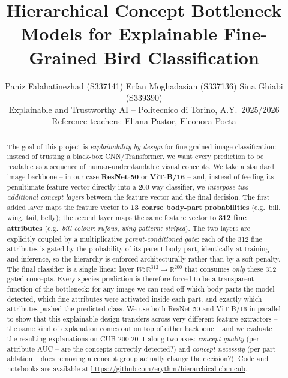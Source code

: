 \documentclass[10pt,conference,twocolumn,a4paper]{article}
\title{\vspace{-2em}\textbf{Hierarchical Concept Bottleneck Models for
Explainable Fine-Grained Bird Classification}}
\author{Paniz Falahatinezhad (S337141) \quad Erfan Moghadasian (S337136) \quad Sina Ghiabi (S339390) \\
\small Explainable and Trustworthy AI -- Politecnico di Torino, A.Y.\ 2025/2026 \\
\small Reference teachers: Eliana Pastor, Eleonora Poeta}
\date{\vspace{-1.5em}}
\begin{document}
\maketitle
\thispagestyle{empty}

\begin{abstract}\small
The goal of this project is \emph{explainability-by-design} for fine-grained
image classification: instead of trusting a black-box CNN/Transformer, we
want every prediction to be readable as a sequence of human-understandable
visual concepts. We take a standard image backbone -- in our case
\textbf{ResNet-50} or \textbf{ViT-B/16} -- and, instead of feeding its
penultimate feature vector directly into a 200-way classifier, we
\emph{interpose two additional concept layers} between the feature vector
and the final decision. The first added layer maps the feature vector to
\textbf{13 coarse body-part probabilities} (e.g.\ bill, wing, tail, belly);
the second layer maps the same feature vector to \textbf{312 fine
attributes} (e.g.\ \emph{bill colour: rufous}, \emph{wing pattern:
striped}). The two layers are explicitly coupled by a multiplicative
\emph{parent-conditioned gate}: each of the 312 fine attributes is gated by
the probability of its parent body part, identically at training and
inference, so the hierarchy is enforced architecturally rather than by a
soft penalty. The final classifier is a single linear layer
$W\!:\!\mathbb{R}^{312}\!\to\!\mathbb{R}^{200}$ that consumes \emph{only}
these 312 gated concepts. Every species prediction is therefore forced to
be a transparent function of the bottleneck: for any image we can read off
which body parts the model detected, which fine attributes were activated
inside each part, and exactly which attributes pushed the predicted class.
We use both ResNet-50 and ViT-B/16 in parallel to show that this
explainable design transfers across very different feature extractors --
the same kind of explanation comes out on top of either backbone -- and we
evaluate the resulting explanations on CUB-200-2011 along two axes:
\emph{concept quality} (per-attribute AUC -- are the concepts correctly
detected?) and \emph{concept necessity} (per-part ablation -- does
removing a concept group actually change the decision?).
Code and notebooks are available at
\url{https://github.com/erythm/hierarchical-cbm-cub}.
\end{abstract}
\end{document}
